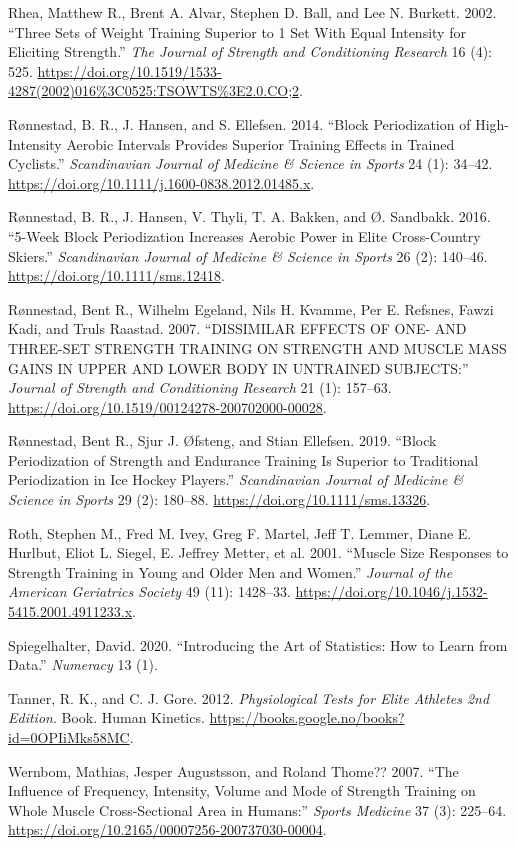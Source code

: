 \documentclass[
  letterpaper,
  DIV=11,
  numbers=noendperiod]{scrreprt}
\newlength{\cslhangindent}
\newenvironment{CSLReferences}[2] %
 {\begin{list}{}{%
  \setlength{\itemindent}{0pt}
  \setlength{\leftmargin}{0pt}
  \setlength{\parsep}{0pt}
  \ifodd #1
   \setlength{\leftmargin}{\cslhangindent}
   \setlength{\itemindent}{-1\cslhangindent}
  \fi
  \setlength{\itemsep}{#2\baselineskip}}}
 {\end{list}}
\begin{document}
\begin{CSLReferences}{1}{0}
Rhea, Matthew R., Brent A. Alvar, Stephen D. Ball, and Lee N. Burkett.
2002. {``Three Sets of Weight Training Superior to 1 Set With Equal
Intensity for Eliciting Strength.''} \emph{The Journal of Strength and
Conditioning Research} 16 (4): 525.
\url{https://doi.org/10.1519/1533-4287(2002)016\%3C0525:TSOWTS\%3E2.0.CO;2}.

Rønnestad, B. R., J. Hansen, and S. Ellefsen. 2014. {``Block
Periodization of High{-}Intensity Aerobic Intervals Provides Superior
Training Effects in Trained Cyclists.''} \emph{Scandinavian Journal of
Medicine \& Science in Sports} 24 (1): 34--42.
\url{https://doi.org/10.1111/j.1600-0838.2012.01485.x}.

Rønnestad, B. R., J. Hansen, V. Thyli, T. A. Bakken, and Ø. Sandbakk.
2016. {``5{-}Week Block Periodization Increases Aerobic Power in Elite
Cross{-}Country Skiers.''} \emph{Scandinavian Journal of Medicine \&
Science in Sports} 26 (2): 140--46.
\url{https://doi.org/10.1111/sms.12418}.

Rønnestad, Bent R., Wilhelm Egeland, Nils H. Kvamme, Per E. Refsnes,
Fawzi Kadi, and Truls Raastad. 2007. {``DISSIMILAR EFFECTS OF ONE- AND
THREE-SET STRENGTH TRAINING ON STRENGTH AND MUSCLE MASS GAINS IN UPPER
AND LOWER BODY IN UNTRAINED SUBJECTS:''} \emph{Journal of Strength and
Conditioning Research} 21 (1): 157--63.
\url{https://doi.org/10.1519/00124278-200702000-00028}.

Rønnestad, Bent R., Sjur J. Øfsteng, and Stian Ellefsen. 2019. {``Block
Periodization of Strength and Endurance Training Is Superior to
Traditional Periodization in Ice Hockey Players.''} \emph{Scandinavian
Journal of Medicine \& Science in Sports} 29 (2): 180--88.
\url{https://doi.org/10.1111/sms.13326}.

Roth, Stephen M., Fred M. Ivey, Greg F. Martel, Jeff T. Lemmer, Diane E.
Hurlbut, Eliot L. Siegel, E. Jeffrey Metter, et al. 2001. {``Muscle Size
Responses to Strength Training in Young and Older Men and Women.''}
\emph{Journal of the American Geriatrics Society} 49 (11): 1428--33.
\url{https://doi.org/10.1046/j.1532-5415.2001.4911233.x}.

Spiegelhalter, David. 2020. {``Introducing the Art of Statistics: How to
Learn from Data.''} \emph{Numeracy} 13 (1).

Tanner, R. K., and C. J. Gore. 2012. \emph{Physiological Tests for Elite
Athletes 2nd Edition}. Book. Human Kinetics.
\url{https://books.google.no/books?id=0OPIiMks58MC}.

Wernbom, Mathias, Jesper Augustsson, and Roland Thome?? 2007. {``The
Influence of Frequency, Intensity, Volume and Mode of Strength Training
on Whole Muscle Cross-Sectional Area in Humans:''} \emph{Sports
Medicine} 37 (3): 225--64.
\url{https://doi.org/10.2165/00007256-200737030-00004}.

\end{CSLReferences}
\end{document}
